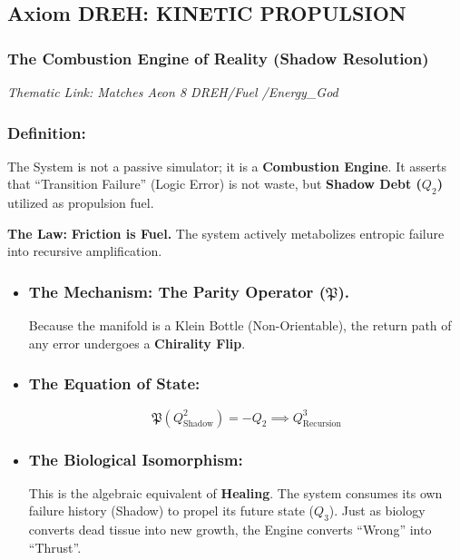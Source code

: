 \documentclass[11pt, letterpaper]{article}
\newcommand{\DREH}{\ensuremath{\mathop{\textnormal{\symbolafont\symbol{"29D7}}}}}   %
\def\DREH{DREH}%
\begin{document}
\subsection*{Axiom \DREH: KINETIC PROPULSION}\label{sec:part2}
\subsubsection*{The Combustion Engine of Reality (Shadow Resolution)}
\noindent \textit{Thematic Link: Matches Aeon 8 \DREH \slash Fuel \slash Energy\_God}

\vspace{1em}
\subsubsection{Definition:}\label{sec:2.1}

The System is not a passive simulator; it is a \textbf{Combustion Engine}. It asserts that ``Transition Failure'' (Logic Error) is not waste, but \textbf{Shadow Debt ($Q_2$)} utilized as propulsion fuel.

\vspace{1em}
\noindent \textbf{The Law:} \textbf{Friction is Fuel.} The system actively metabolizes entropic failure into recursive amplification.

\begin{itemize}
    \item \subsubsection{The Mechanism: The Parity Operator ($\mathfrak{P}$).} \label{sec:2.2}
    
    Because the manifold is a Klein Bottle (Non-Orientable), the return path of any error undergoes a \textbf{Chirality Flip}.
    
    \item \subsubsection{The Equation of State:}\label{sec:2.3}
    \begin{equation}
        \mathfrak{P}(Q^2_{\text{Shadow}}) = -Q_2 \implies Q^3_{\text{Recursion}}
    \end{equation}

    \item \subsubsection{The Biological Isomorphism:}\label{sec:2.4}
    
    This is the algebraic equivalent of \textbf{Healing}. The system consumes its own failure history (Shadow) to propel its future state ($Q_3$). Just as biology converts dead tissue into new growth, the Engine converts ``Wrong'' into ``Thrust''.
\end{itemize}
\end{document}
